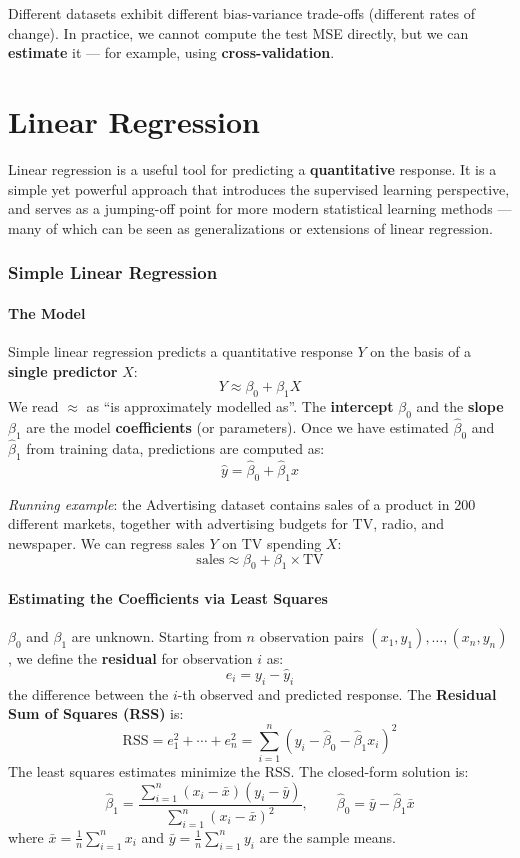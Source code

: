 \documentclass[11pt,a4paper]{article}
\theoremstyle{definition}
\theoremstyle{plain}
\theoremstyle{remark}
\begin{document}
Different datasets exhibit different bias-variance trade-offs (different rates of change). In practice, we cannot compute the test MSE directly, but we can \textbf{estimate} it — for example, using \textbf{cross-validation}.


\part{Linear Regression}

Linear regression is a useful tool for predicting a \textbf{quantitative} response. It is a simple yet powerful approach that introduces the supervised learning perspective, and serves as a jumping-off point for more modern statistical learning methods — many of which can be seen as generalizations or extensions of linear regression.

\section{Simple Linear Regression}

\subsection{The Model}

Simple linear regression predicts a quantitative response $Y$ on the basis of a \textbf{single predictor} $X$:
\[
    Y \approx \beta_0 + \beta_1 X
\]
We read $\approx$ as ``is approximately modelled as''. The \textbf{intercept} $\beta_0$ and the \textbf{slope} $\beta_1$ are the model \textbf{coefficients} (or parameters). Once we have estimated $\hat{\beta}_0$ and $\hat{\beta}_1$ from training data, predictions are computed as:
\[
    \hat{y} = \hat{\beta}_0 + \hat{\beta}_1 x
\]

\textit{Running example}: the Advertising dataset contains sales of a product in 200 different markets, together with advertising budgets for TV, radio, and newspaper. We can regress sales $Y$ on TV spending $X$:
\[
    \text{sales} \approx \beta_0 + \beta_1 \times \text{TV}
\]

\subsection{Estimating the Coefficients via Least Squares}

$\beta_0$ and $\beta_1$ are unknown. Starting from $n$ observation pairs $(x_1, y_1), \ldots, (x_n, y_n)$, we define the \textbf{residual} for observation $i$ as:
\[
    e_i = y_i - \hat{y}_i
\]
the difference between the $i$-th observed and predicted response. The \textbf{Residual Sum of Squares (RSS)} is:
\[
    \mathrm{RSS} = e_1^2 + \cdots + e_n^2
    = \sum_{i=1}^{n}(y_i - \hat{\beta}_0 - \hat{\beta}_1 x_i)^2
\]
The least squares estimates minimize the RSS. The closed-form solution is:
\[
    \hat{\beta}_1 = \frac{\sum_{i=1}^{n}(x_i - \bar{x})(y_i - \bar{y})}{\sum_{i=1}^{n}(x_i - \bar{x})^2}, \qquad
    \hat{\beta}_0 = \bar{y} - \hat{\beta}_1 \bar{x}
\]
where $\bar{x} = \frac{1}{n}\sum_{i=1}^n x_i$ and $\bar{y} = \frac{1}{n}\sum_{i=1}^n y_i$ are the sample means.
\end{document}
